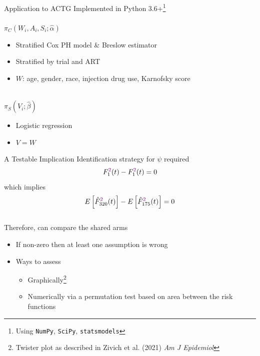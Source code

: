 \documentclass{beamer}
\newcommand{\violet}[1]{\textcolor{violet}{#1}}
\begin{document}
\begin{frame}{Application to ACTG}
	Implemented in Python 3.6+\footnote[frame]{Using \texttt{NumPy}, \texttt{SciPy}, \texttt{statsmodels}}
	\\~\\
	$\pi_C(W_i, A_i, S_i; \hat{\alpha})$
	\begin{itemize}
		\item Stratified Cox PH model \& Breslow estimator
		\item Stratified by trial and ART
		\item $W$: age, gender, race, injection drug use, Karnofsky score 
	\end{itemize}~\\
	$\pi_S(V_i; \hat{\beta})$
	\begin{itemize}
		\item Logistic regression
		\item $V=W$
	\end{itemize}
\end{frame}

\begin{frame}{A Testable Implication}
	Identification strategy for $\psi$ required
	\[F_1^{\violet{2}}(t) - F_1^{\violet{2}}(t) = 0\]
	which implies
	\[E\left[\hat{F}_{320}^{\violet{2}}(t)\right] - E\left[\hat{F}_{175}^{\violet{2}}(t)\right] = 0\]
	~\\
	Therefore, can compare the shared arms
	\begin{itemize}
		\item If non-zero then at least one assumption is wrong
		\item Ways to assess
		\begin{itemize}
			\item Graphically\footnote[frame]{Twister plot as described in Zivich et al. (2021) \textit{Am J Epidemiol}}
			\item Numerically via a permutation test based on area between the risk functions
		\end{itemize}
	\end{itemize}
\end{frame}
\end{document}
